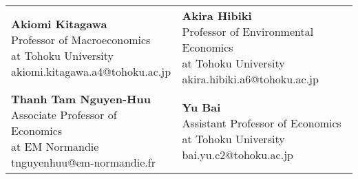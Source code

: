 \documentclass[12pt]{article}
\begin{document}
\begin{center}
    \begin{tabular}{p{7cm} p{7cm}}
        \parbox[t]{7cm}{
            {\bf Akiomi Kitagawa} \\ 
            Professor of Macroeconomics \\
	    at Tohoku University \\
            akiomi.kitagawa.a4@tohoku.ac.jp
        } 
        
        & 
        
        \parbox[t]{7cm}{
        {\bf Akira Hibiki} \\ 
        Professor of Environmental Economics \\
	at Tohoku University \\
        akira.hibiki.a6@tohoku.ac.jp
        } 
        
        \\
        
        \vspace{1em}
        \parbox[t]{7cm}{
        {\bf Thanh Tam Nguyen-Huu} \\ 
        Associate Professor of Economics \\
	at EM Normandie  \\
        tnguyenhuu@em-normandie.fr
        }
        
        &
        
        \vspace{1em}
        \parbox[t]{7cm}{
        {\bf Yu Bai} \\ 
        Assistant Professor of Economics\\ 
	at Tohoku University \\
        bai.yu.c2@tohoku.ac.jp
        }
    \end{tabular}
\end{center}
\end{document}
